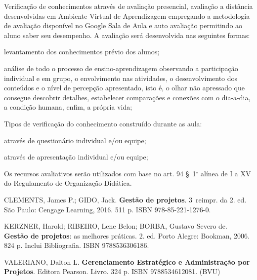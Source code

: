 \begin{pud}
	
	\avaliacao
	Verificação de conhecimentos através de avaliação presencial, avaliação a distância desenvolvidas em Ambiente Virtual de Aprendizagem empregando a metodologia de avaliação disponível no Google Sala de Aula e auto avaliação permitindo ao aluno saber seu desempenho. A avaliação será desenvolvida nas seguintes formas:
	\begin{description}[itemsep=0em, ]
		\item[$\bullet$ Diagnóstica --] levantamento dos conhecimentos prévio dos alunos;
        \item[$\bullet$ Continuada --] análise de todo o processo de ensino-aprendizagem observando a participação individual e em grupo, o envolvimento nas atividades, o desenvolvimento dos conteúdos e o nível de percepção apresentado, isto é, o olhar não apressado que consegue descobrir detalhes, estabelecer comparações e conexões com o dia-a-dia, a condição humana, enfim, a própria vida;
	\end{description}
        
    Tipos de verificação do conhecimento construído durante as aula: 
	\begin{description}[itemsep=0em, ]
		\item[$\bullet$ Escrita,] através de questionário individual e/ou equipe;
        \item[$\bullet$ Oral,] através de apresentação individual e/ou equipe;
	\end{description}
	Os recursos avaliativos serão utilizados com base  no art. 94 \S~1$^\circ$ alínea de I a XV do Regulamento de Organização Didática.
	
	\naopresencial


	\begin{bibbasica}
		
		\item CLEMENTS, James P.; GIDO, Jack. \textbf{Gestão de projetos}. 3\textordfeminine\ reimpr. da 2. ed. São Paulo: Cengage Learning, 2016. 511 p. ISBN 978-85-221-1276-0.	
        \item KERZNER, Harold; RIBEIRO, Lene Belon; BORBA, Gustavo Severo de. \textbf{Gestão de projetos}: as melhores práticas. 2. ed. Porto Alegre: Bookman, 2006. 824 p. Inclui Bibliografia. ISBN 9788536306186.
		\item VALERIANO, Dalton L. \textbf{Gerenciamento Estratégico e Administração por Projetos}. Editora Pearson. Livro. 324 p. ISBN 9788534612081. (BVU) 	
		
	\end{bibbasica}
	

\end{pud}

